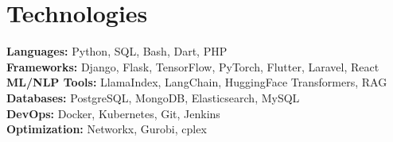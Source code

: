 \documentclass[10pt, letterpaper]{article}
\begin{document}
\section*{Technologies}
\begin{multicols}{2}
    \textbf{Languages:} Python, SQL, Bash, Dart, PHP \\
    \textbf{Frameworks:} Django, Flask, TensorFlow, PyTorch, Flutter, Laravel, React \\
    \textbf{ML/NLP Tools:} LlamaIndex, LangChain, HuggingFace Transformers, RAG \\
    \textbf{Databases:} PostgreSQL, MongoDB, Elasticsearch, MySQL \\
    \textbf{DevOps:} Docker, Kubernetes, Git, Jenkins \\
    \textbf{Optimization:} Networkx, Gurobi, cplex
\end{multicols}

    
\end{document}
